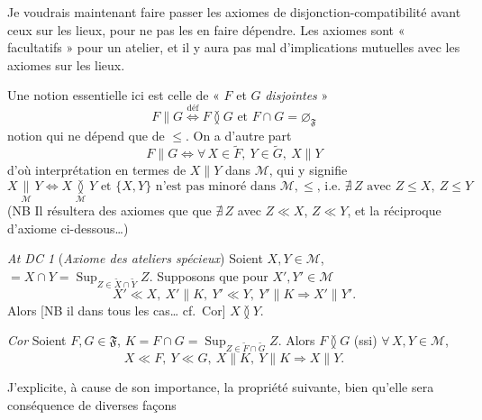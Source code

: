 \documentclass[11pt,a4paper]{article}
\begin{document}
Je voudrais maintenant faire passer les axiomes de disjonction-compatibilité  avant ceux sur les lieux, pour ne pas les en faire dépendre. Les axiomes sont « facultatifs » pour un atelier, et il y aura pas mal d'implications mutuelles avec les axiomes sur les lieux.

Une notion essentielle ici est celle de « $F$ et $G$ \emph{disjointes} »
\[
  F \parallel G \overset{\mathrm{déf}}{\Longleftrightarrow} F \between G \text{ et } F \cap G = \varnothing_{\mathfrak{F}}
\]
notion qui ne dépend que de $\leq$. On a d'autre part
\[
  F \parallel G \Longleftrightarrow \forall\, X \in \widetilde{F},\ Y \in \widetilde{G},\ X \parallel Y
\]
d'où interprétation en termes de $X \parallel Y$ dans $\mathcal{M}$, qui y signifie
\[
  X \underset{\mathcal{M}}{\parallel} Y \Longleftrightarrow X \underset{\mathcal{M}}{\between} Y \text{ et } \lbrace X, Y \rbrace \text{ n'est pas minoré dans } \mathcal{M}, \leq \text{, i.e.\ } \nexists\, Z \text{ avec } Z \leq X,\ Z \leq Y
\]
(NB Il résultera des axiomes  que \ill{}  que $\nexists\, Z$ avec $Z \ll X$, $Z \ll Y$,  et la réciproque  d'axiome ci-dessous…)

\emph{At DC 1} (\emph{Axiome des ateliers spécieux}) Soient $X, Y \in \mathcal{M}$,  $= X \cap Y = \mathop{\mathrm{Sup}}_{Z \in \widetilde{X} \cap \widetilde{Y}} Z$. Supposons que pour  $X', Y' \in \mathcal{M}$
\[
  X' \ll X,\ X' \parallel K,\ Y' \ll Y,\ Y' \parallel K \Longrightarrow X' \parallel Y' .
\]
Alors [NB il \ill{} dans tous les cas… cf.\ Cor] $X \between Y$.

\emph{Cor} \quad Soient $F, G \in \mathfrak{F}$, $K = F \cap G = \mathop{\mathrm{Sup}}_{Z \in \widetilde{F} \cap \widetilde{G}} Z$. Alors $F \between G$ (ssi) $\forall\, X, Y \in \mathcal{M}$,
\[
  X \ll F,\ Y \ll G,\ X \parallel K,\ Y \parallel K \Longrightarrow X \parallel Y .
\]


J'explicite, à cause de son importance, la propriété suivante, bien qu'elle sera conséquence de diverses façons \ill{}
\end{document}
